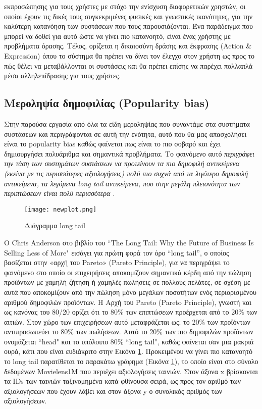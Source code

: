 εκπροσώπησης για τους χρήστες με στόχο την ενίσχυση διαφορετικών χρηστών, οι οποίοι έχουν τις δικές τους συγκεκριμένες φυσικές και γνωστικές ικανότητες, για την καλύτερη κατανόηση των  συστάσεων που τους παρουσιάζονται. Ένα παράδειγμα που μπορεί να δοθεί για αυτό ώστε να γίνει πιο κατανοητό, είναι ένας χρήστης με προβλήματα όρασης. Τέλος, ορίζεται η δικαιοσύνη δράσης και έκφρασης (Action \& Expression) όπου το σύστημα θα πρέπει να δίνει τον έλεγχο στον χρήστη ως προς το πώς θέλει να μεταβάλλονται οι συστάσεις και θα πρέπει επίσης να παρέχει πολλαπλά μέσα αλληλεπίδρασης για τους χρήστες.
\noindent \subsection{Μεροληψία δημοφιλίας (Popularity bias)}\label{popularity bias}
\noindent Στην παρούσα εργασία από όλα τα είδη μεροληψίας που συναντάμε στα συστήματα συστάσεων και περιγράφονται σε αυτή την ενότητα, αυτό που θα μας απασχολήσει είναι το popularity bias καθώς φαίνεται πως είναι το πιο σοβαρό και έχει δημιουργήσει πολυάριθμα και σημαντικά προβλήματα. Το φαινόμενο αυτό \textit{περιγράφει την τάση των συστημάτων συστάσεων να προτείνουν τα πιο δημοφιλή αντικείμενα (εκείνα με τις περισσότερες αξιολογήσεις) πολύ πιο συχνά από τα λιγότερο δημοφιλή αντικείμενα, τα λεγόμενα long tail αντικείμενα, που στην μεγάλη πλειονότητα των περιπτώσεων είναι πολύ περισσότερα \cite{parkLongTailRecommender2008}}. 
\begin{figure}[H]
	\centering
	\texttt{[image: newplot.png]}
	\caption{Διάγραμμα long tail}
	\label{fig:longtail}
\end{figure}
\noindent Ο Chris Anderson στο βιβλίο του ``The Long Tail: Why the Future of Business Is Selling Less of More" \cite{andersonLongTailWhy2006} εισάγει για πρώτη φορά τον όρο “long tail”, ο οποίος βασίζεται στην «αρχή του Pareto» (Pareto Principle), για να περιγράψει το φαινόμενο στο οποίο οι επιχειρήσεις αποκομίζουν σημαντικά κέρδη από την πώληση προϊόντων με χαμηλή ζήτηση ή χαμηλές πωλήσεις σε πολλούς πελάτες, σε σχέση με αυτά που αποκομίζουν από την πώληση μόνο μεγάλων ποσοτήτων ενός περιορισμένου αριθμού δημοφιλών προϊόντων. Η Αρχή του Pareto (Pareto Principle), γνωστή και ως κανόνας του 80/20 ορίζει ότι το 80\% των επιπτώσεων προέρχεται από το 20\% των αιτιών. Στον χώρο των επιχειρήσεων αυτό μεταφράζεται ως: το 20\% των προϊόντων αντιπροσωπεύει το 80\%  των πωλήσεων. Αυτό το 20\% των πιο δημοφιλών προϊόντων ονομάζεται ``head" και το υπόλοιπο 80\% ``long tail", καθώς φαίνεται σαν μια μακριά ουρά, κάτι που είναι ευδιάκριτο στην Εικόνα \ref{fig:longtail}.
Προκειμένου να γίνει πιο κατανοητό το long tail παρατίθεται το παρακάτω γράφημα (Εικόνα \ref{fig:longtail}), το οποίο είναι στο σύνολο δεδομένων Movielens1M που περιέχει αξιολογήσεις ταινιών. Στον άξονα x βρίσκονται τα IDs των ταινιών ταξινομημένα κατά φθίνουσα σειρά, ως προς τον αριθμό των αξιολογήσεων που έχουν λάβει και στον άξονα y ο συνολικός αριθμός των αξιολογήσεων.

